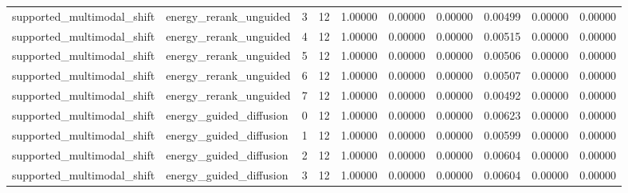 \documentclass{article}
\begin{document}
\begin{table}[tbp]
{\begin{tabular}{llllllllll}
supported\_multimodal\_shift & energy\_rerank\_unguided & 3 & 12 & 1.00000 & 0.00000 & 0.00000 & 0.00499 & 0.00000 & 0.00000 \\
supported\_multimodal\_shift & energy\_rerank\_unguided & 4 & 12 & 1.00000 & 0.00000 & 0.00000 & 0.00515 & 0.00000 & 0.00000 \\
supported\_multimodal\_shift & energy\_rerank\_unguided & 5 & 12 & 1.00000 & 0.00000 & 0.00000 & 0.00506 & 0.00000 & 0.00000 \\
supported\_multimodal\_shift & energy\_rerank\_unguided & 6 & 12 & 1.00000 & 0.00000 & 0.00000 & 0.00507 & 0.00000 & 0.00000 \\
supported\_multimodal\_shift & energy\_rerank\_unguided & 7 & 12 & 1.00000 & 0.00000 & 0.00000 & 0.00492 & 0.00000 & 0.00000 \\
supported\_multimodal\_shift & energy\_guided\_diffusion & 0 & 12 & 1.00000 & 0.00000 & 0.00000 & 0.00623 & 0.00000 & 0.00000 \\
supported\_multimodal\_shift & energy\_guided\_diffusion & 1 & 12 & 1.00000 & 0.00000 & 0.00000 & 0.00599 & 0.00000 & 0.00000 \\
supported\_multimodal\_shift & energy\_guided\_diffusion & 2 & 12 & 1.00000 & 0.00000 & 0.00000 & 0.00604 & 0.00000 & 0.00000 \\
supported\_multimodal\_shift & energy\_guided\_diffusion & 3 & 12 & 1.00000 & 0.00000 & 0.00000 & 0.00604 & 0.00000 & 0.00000 \\
\bottomrule
\end{tabular}
}
\end{table}

\clearpage
\end{document}
